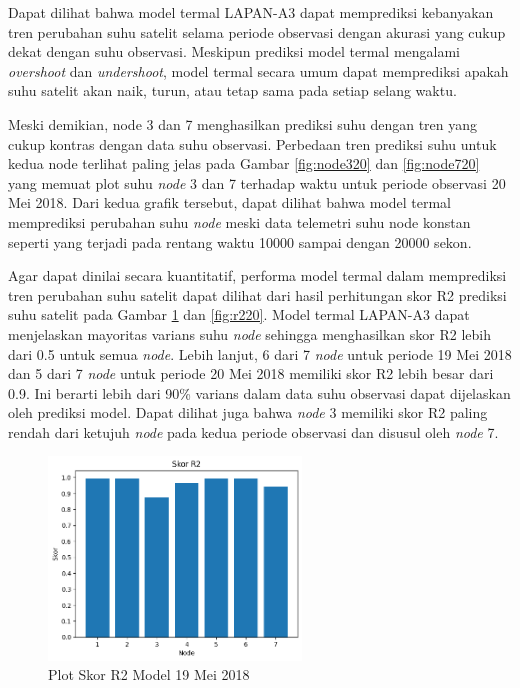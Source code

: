 Dapat dilihat bahwa model termal LAPAN-A3 dapat memprediksi kebanyakan tren
perubahan suhu  satelit selama periode observasi dengan akurasi yang
cukup dekat dengan suhu observasi. Meskipun prediksi model termal mengalami
\textit{overshoot} dan \textit{undershoot}, model termal secara umum dapat
memprediksi apakah suhu  satelit akan naik, turun, atau tetap sama
pada setiap selang waktu.

Meski demikian, node 3 dan 7 menghasilkan prediksi suhu
dengan tren yang cukup kontras dengan data suhu observasi. Perbedaan tren
prediksi suhu untuk kedua node terlihat paling jelas pada Gambar \ref{fig:node320}
dan \ref{fig:node720} yang memuat plot suhu \textit{node} 3 dan 7 terhadap waktu untuk
periode observasi 20 Mei 2018. Dari kedua grafik tersebut, dapat dilihat bahwa
model termal memprediksi perubahan suhu \textit{node} meski data telemetri suhu node
konstan seperti yang terjadi pada rentang waktu 10000 sampai dengan 20000
sekon.

Agar dapat dinilai secara kuantitatif, performa model termal dalam memprediksi
tren perubahan suhu  satelit dapat dilihat dari hasil perhitungan skor
R2 prediksi suhu  satelit pada Gambar \ref{fig:r219} dan
\ref{fig:r220}. Model termal LAPAN-A3 dapat menjelaskan mayoritas varians suhu
\textit{node} sehingga menghasilkan skor R2 lebih dari 0.5 untuk semua \textit{node}. Lebih
lanjut, 6 dari 7 \textit{node} untuk periode 19 Mei 2018 dan 5 dari 7 \textit{node} untuk periode
20 Mei 2018 memiliki skor R2 lebih besar dari 0.9. Ini berarti lebih dari 90\%
varians dalam data suhu observasi dapat dijelaskan oleh prediksi model. Dapat
dilihat juga bahwa \textit{node} 3 memiliki skor R2 paling rendah dari ketujuh \textit{node} pada
kedua periode observasi dan disusul oleh \textit{node} 7.

\begin{figure}[H]
\setlength{}
\begin{center}
\includegraphics[width=0.6\textwidth]{fig/r2_2018-05-19.png}
\caption{Plot Skor R2 Model 19 Mei 2018}
\label{fig:r219}
\end{center}
\end{figure}

